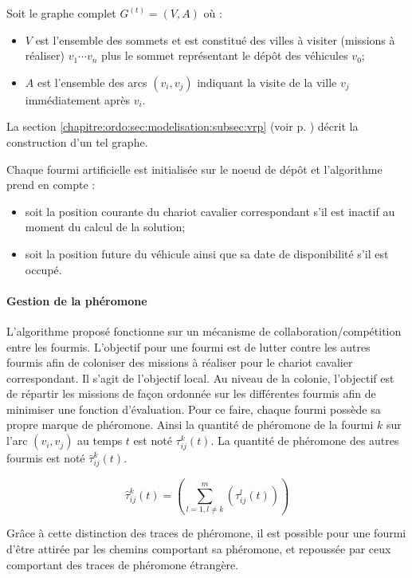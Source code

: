 Soit le graphe complet $G^{(t)}=(V,A)$ où :

\begin{itemize}
 \item $V$ est l'ensemble des sommets et est constitué des villes à visiter (missions à réaliser) $v_1 \cdots v_n$ plus le sommet représentant le dépôt des véhicules $v_0$;
 \item $A$ est l'ensemble des arcs $(v_i,v_j)$ indiquant la visite de la ville $v_j$ immédiatement après $v_i$.
\end{itemize}

La section \ref{chapitre:ordo:sec:modelisation:subsec:vrp} (voir p. \pageref{chapitre:ordo:sec:modelisation:subsec:vrp}) décrit la construction d'un tel graphe.

Chaque fourmi artificielle est initialisée sur le noeud de dépôt et l'algorithme prend en compte : 
\begin{itemize}
 \item soit la position courante du chariot cavalier correspondant s'il est inactif au moment du calcul de la solution;
 \item soit la position future du véhicule ainsi que sa date de disponibilité s'il est occupé.
\end{itemize}

\paragraph{Gestion de la phéromone}

L'algorithme proposé fonctionne sur un mécanisme de collaboration/compétition entre les fourmis. L'objectif pour une fourmi est de lutter contre les autres fourmis afin de coloniser des missions à réaliser pour le chariot cavalier correspondant. Il s'agit de l'objectif local. Au niveau de la colonie, l'objectif est de répartir les missions de façon ordonnée sur les différentes fourmis afin de minimiser une fonction d'évaluation.
Pour ce faire, chaque fourmi possède sa propre marque de phéromone. Ainsi la quantité de phéromone de la fourmi $k$ sur l'arc $(v_i,v_j)$ au temps $t$ est noté $\tau^k_{ij}(t)$. La quantité de phéromone des autres fourmis est noté $\hat \tau^k_{ij}(t)$.

\begin{equation}
  \hat \tau^k_{ij}(t) = \left( \sum \limits_{l=1, l \neq k}^{m} (\tau^l_{ij}(t)) \right)
\end{equation}

Grâce à cette distinction des traces de phéromone, il est possible pour une fourmi d'être attirée par les chemins comportant sa phéromone, et repoussée par ceux comportant des traces de phéromone étrangère.

